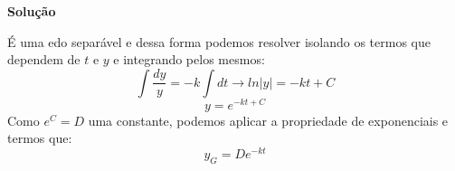\linespread{1.5}

\textbf{Solução} 

É uma edo separável e dessa forma podemos resolver isolando os termos que dependem de $t$ e $y$ e integrando pelos mesmos:
\begin{equation*}
    \int \frac{dy}{y} = -k \int dt \longrightarrow ln|y| = -kt + C
\end{equation*}
\begin{equation*}
    y = e^{-kt+ C}
\end{equation*}
Como $e^C = D$ uma constante, podemos aplicar a propriedade de exponenciais e termos que:
\begin{equation*}
    \boxed{y_G = De^{-kt}}
\end{equation*}